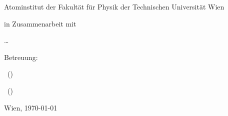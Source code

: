 \begin{titlepage}
   \par
  \vspace{0.1cm}
  \Large \textbf{\Name} \par
  \vspace{0.1cm}
   \large\MatNr \par
  \vspace{1cm}
  \flushleft \small
  \par
  Atominstitut der Fakultät für Physik der Technischen Universität
  Wien \par
  in Zusammenarbeit mit \par
  \dots \par
  \vspace{1cm} Betreuung: \par
  \BetreuerA\ (\UniA) \par
  \BetreuerB\ (\UniB)\par

  \vspace*{1.5cm}

  Wien, \today \hspace{2cm} \par

  

\end{titlepage}


